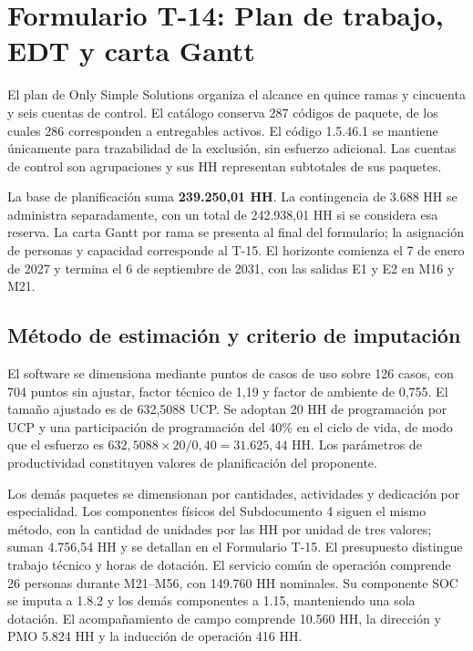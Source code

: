 \documentclass[11pt]{article}
\begin{document}
\renewcommand{\listtablename}{Índice de tablas}
\renewcommand{\tablename}{Tabla}
\renewcommand{\thetable}{T-14.\arabic{table}}
\renewcommand{\thefigure}{T-14.\arabic{figure}}
\tableofcontents
\clearpage
\listoffigures
\listoftables
\clearpage
\section*{Formulario T-14: Plan de trabajo, EDT y carta Gantt}

El plan de Only Simple Solutions organiza el alcance en quince ramas y cincuenta y seis cuentas de control. El catálogo conserva 287 códigos de paquete, de los cuales 286 corresponden a entregables activos. El código 1.5.46.1 se mantiene únicamente para trazabilidad de la exclusión, sin esfuerzo adicional. Las cuentas de control son agrupaciones y sus HH representan subtotales de sus paquetes.

La base de planificación suma \textbf{239.250,01 HH}. La contingencia de 3.688 HH se administra separadamente, con un total de 242.938,01 HH si se considera esa reserva. La carta Gantt por rama se presenta al final del formulario; la asignación de personas y capacidad corresponde al T-15. El horizonte comienza el 7 de enero de 2027 y termina el 6 de septiembre de 2031, con las salidas E1 y E2 en M16 y M21.

\subsection{Método de estimación y criterio de imputación}

El software se dimensiona mediante puntos de casos de uso sobre 126 casos, con 704 puntos sin ajustar, factor técnico de 1,19 y factor de ambiente de 0,755. El tamaño ajustado es de 632,5088 UCP. Se adoptan 20 HH de programación por UCP y una participación de programación del 40\% en el ciclo de vida, de modo que el esfuerzo es $632{,}5088\times20/0{,}40=31.625{,}44$ HH. Los parámetros de productividad constituyen valores de planificación del proponente.

Los demás paquetes se dimensionan por cantidades, actividades y dedicación por especialidad. Los componentes físicos del Subdocumento 4 siguen el mismo método, con la cantidad de unidades por las HH por unidad de tres valores; suman 4.756,54 HH y se detallan en el Formulario T-15. El presupuesto distingue trabajo técnico y horas de dotación. El servicio común de operación comprende 26 personas durante M21--M56, con 149.760 HH nominales. Su componente SOC se imputa a 1.8.2 y los demás componentes a 1.15, manteniendo una sola dotación. El acompañamiento de campo comprende 10.560 HH, la dirección y PMO 5.824 HH y la inducción de operación 416 HH.
\end{document}

